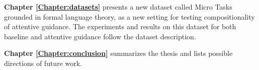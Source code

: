 	
	
	\textbf{Chapter \ref{Chapter:datasets}} presents a new dataset called Micro Tasks grounded in formal language theory, as a new setting for testing compositionality of attentive guidance. The experiments and results on this dataset for both baseline and attentive guidance follow the dataset description.
	
	\textbf{Chapter \ref{Chapter:conclusion}} summarizes the thesis and lists possible directions of future work.


				